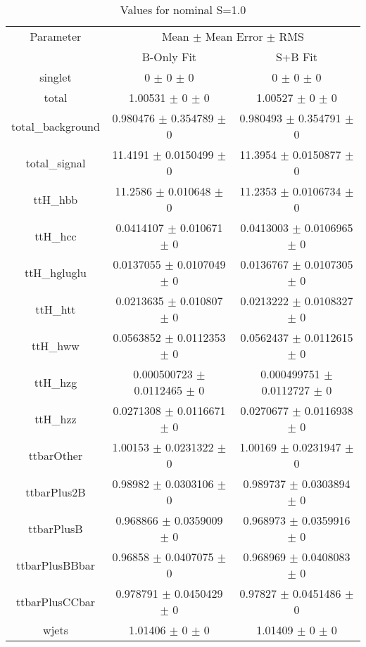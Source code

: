 \begin{table}
\centering
\caption{Values for nominal S=1.0}
\begin{tabular}{ccc}
\toprule
Parameter & \multicolumn{2}{c}{Mean $\pm$ Mean Error $\pm$ RMS}\\
 & B-Only Fit & S+B Fit\\
\midrule
singlet & \num{0} $\pm$ \num{0} $\pm$ \num{0} & \num{0} $\pm$ \num{0} $\pm$ \num{0}\\
total & \num{1.00531} $\pm$ \num{0} $\pm$ \num{0} & \num{1.00527} $\pm$ \num{0} $\pm$ \num{0}\\
total\_background & \num{0.980476} $\pm$ \num{0.354789} $\pm$ \num{0} & \num{0.980493} $\pm$ \num{0.354791} $\pm$ \num{0}\\
total\_signal & \num{11.4191} $\pm$ \num{0.0150499} $\pm$ \num{0} & \num{11.3954} $\pm$ \num{0.0150877} $\pm$ \num{0}\\
ttH\_hbb & \num{11.2586} $\pm$ \num{0.010648} $\pm$ \num{0} & \num{11.2353} $\pm$ \num{0.0106734} $\pm$ \num{0}\\
ttH\_hcc & \num{0.0414107} $\pm$ \num{0.010671} $\pm$ \num{0} & \num{0.0413003} $\pm$ \num{0.0106965} $\pm$ \num{0}\\
ttH\_hgluglu & \num{0.0137055} $\pm$ \num{0.0107049} $\pm$ \num{0} & \num{0.0136767} $\pm$ \num{0.0107305} $\pm$ \num{0}\\
ttH\_htt & \num{0.0213635} $\pm$ \num{0.010807} $\pm$ \num{0} & \num{0.0213222} $\pm$ \num{0.0108327} $\pm$ \num{0}\\
ttH\_hww & \num{0.0563852} $\pm$ \num{0.0112353} $\pm$ \num{0} & \num{0.0562437} $\pm$ \num{0.0112615} $\pm$ \num{0}\\
ttH\_hzg & \num{0.000500723} $\pm$ \num{0.0112465} $\pm$ \num{0} & \num{0.000499751} $\pm$ \num{0.0112727} $\pm$ \num{0}\\
ttH\_hzz & \num{0.0271308} $\pm$ \num{0.0116671} $\pm$ \num{0} & \num{0.0270677} $\pm$ \num{0.0116938} $\pm$ \num{0}\\
ttbarOther & \num{1.00153} $\pm$ \num{0.0231322} $\pm$ \num{0} & \num{1.00169} $\pm$ \num{0.0231947} $\pm$ \num{0}\\
ttbarPlus2B & \num{0.98982} $\pm$ \num{0.0303106} $\pm$ \num{0} & \num{0.989737} $\pm$ \num{0.0303894} $\pm$ \num{0}\\
ttbarPlusB & \num{0.968866} $\pm$ \num{0.0359009} $\pm$ \num{0} & \num{0.968973} $\pm$ \num{0.0359916} $\pm$ \num{0}\\
ttbarPlusBBbar & \num{0.96858} $\pm$ \num{0.0407075} $\pm$ \num{0} & \num{0.968969} $\pm$ \num{0.0408083} $\pm$ \num{0}\\
ttbarPlusCCbar & \num{0.978791} $\pm$ \num{0.0450429} $\pm$ \num{0} & \num{0.97827} $\pm$ \num{0.0451486} $\pm$ \num{0}\\
wjets & \num{1.01406} $\pm$ \num{0} $\pm$ \num{0} & \num{1.01409} $\pm$ \num{0} $\pm$ \num{0}\\
\bottomrule
\end{tabular}
\end{table}